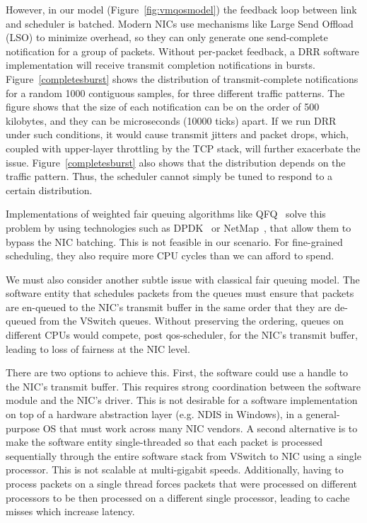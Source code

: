 However, in our model  (Figure~\ref{fig:vmqosmodel}) the feedback loop between
link and scheduler is batched.  Modern NICs use mechanisms like Large Send
Offload (LSO) to minimize overhead, so they can only generate one send-complete
notification for a group of packets.  Without per-packet feedback, a DRR
software implementation will receive transmit completion notifications in
bursts. Figure~\ref{completesburst} shows the distribution of transmit-complete
notifications for a random 1000 contiguous samples, for three different traffic patterns.
The figure shows that the size of each notification can be on the order
of 500 kilobytes, and they can be microseconds (10000 ticks) apart. If
we run DRR under such conditions, it would cause transmit
jitters and packet drops, which, coupled with upper-layer throttling by the TCP
stack, will further exacerbate the issue.  Figure~\ref{completesburst} also shows that 
the distribution depends on the traffic pattern. Thus, the scheduler cannot
simply be tuned to respond to a certain distribution.

Implementations of weighted fair queuing algorithms like QFQ~\cite{qfq} solve
this problem by using technologies such as DPDK~\cite{dpdk} or
NetMap~\cite{netmap}, that allow them to bypass the NIC batching.  This is not
feasible in our scenario. For fine-grained scheduling, they also require more
CPU cycles than we can afford to spend.

We must also consider another subtle issue with classical fair queuing model.  
The software entity that schedules packets from the queues must ensure that 
packets are en-queued to the NIC's transmit buffer in the same order that they 
are de-queued from the VSwitch queues.  Without preserving the ordering,
queues on different CPUs would compete, post qos-scheduler, for the NIC's
transmit buffer, leading to loss of fairness at the NIC level.

There are two options to achieve this. First, the software could use a handle to
the NIC's transmit buffer.  This requires strong coordination between the
software module and the NIC's driver.  This is not desirable for a software
implementation on top of a hardware abstraction layer (e.g. NDIS in Windows), 
in a general-purpose OS that must work across many NIC vendors. A second
alternative is to make the software entity single-threaded so that each packet
is processed sequentially through the entire software stack from VSwitch to NIC
using a single processor. This is not scalable at multi-gigabit speeds.
Additionally, having to process packets on a single thread forces packets that
were processed on different processors to be then processed on a different
single processor, leading to cache misses which increase latency.  

